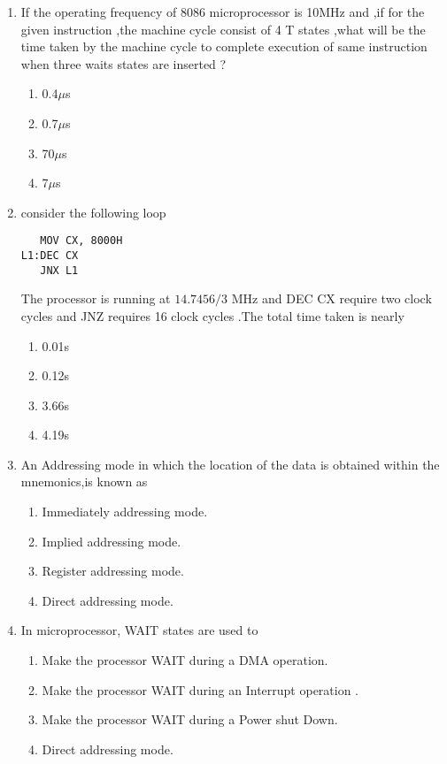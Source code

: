 \documentclass[journal,12pt,twocolumn]{IEEEtran}
\begin{document}
\begin{enumerate}
%

\item If the operating frequency of 8086 microprocessor is 10MHz and ,if for the given instruction ,the machine cycle consist of 4 T states ,what will be the time taken by the machine cycle to complete execution of same instruction when three waits states are inserted ?\\  
%

\begin{enumerate}
\item 0.4$\mu$s
\item 0.7$\mu$s
\item 70$\mu$s
\item 7$\mu$s
\end{enumerate}
\item consider the following loop\\
\begin{verbatim}
   MOV CX, 8000H
L1:DEC CX
   JNX L1
\end{verbatim}
The processor is running at $14.7456/3$ MHz and DEC CX require two clock cycles and JNZ requires 16 clock cycles .The total time taken is nearly \\
\begin{enumerate}
\item 0.01s
\item 0.12s
\item 3.66s
\item 4.19s
\end{enumerate}
\item An Addressing mode in which the location of the data is obtained within the mnemonics,is known as 
  \begin{enumerate}
\item Immediately addressing mode.
\item Implied addressing mode.
\item Register addressing mode.
\item Direct addressing mode.
\end{enumerate}                 
\item In microprocessor, WAIT states are used to 
  \begin{enumerate}
\item Make the processor WAIT during a DMA operation.
\item Make the processor WAIT during an Interrupt operation .
\item Make the processor WAIT during a Power shut Down.
\item Direct addressing mode.
\end{enumerate}              

 \end{enumerate}
  
\end{document}
